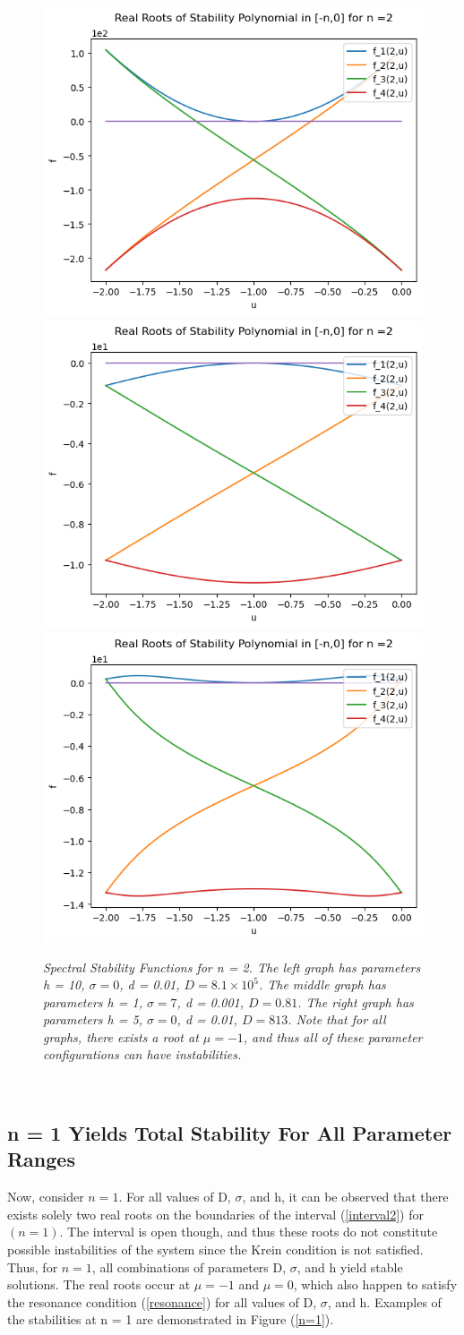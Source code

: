 \documentclass{article}
\begin{document}
\begin{figure}[hbt!]
\centering
\includegraphics[width=.3\textwidth]{special1.png}\hfill
\includegraphics[width=.3\textwidth]{special2.png}\hfill
\includegraphics[width=.3\textwidth]{special3.png}\hfill
\caption{\emph{Spectral Stability Functions for n = 2. The left graph has parameters h = 10, \(\sigma = 0\), d = 0.01, \(D = 8.1 \times 10^5\). The middle graph has parameters h = 1, \(\sigma = 7\), d = 0.001, \(D = 0.81\). The right graph has parameters h = 5, \(\sigma = 0\), d = 0.01, \(D = 813\). Note that for all graphs, there exists a root at \(\mu = -1\), and thus all of these parameter configurations can have instabilities. }}
\label{n=2}
\end{figure}
\\

\subsection{n = 1 Yields Total Stability For All Parameter Ranges}

Now, consider \(n = 1\). For all values of D, \(\sigma\), and h, it can be observed that there exists solely two real roots on the boundaries of the interval (\ref{interval2}) for \((n = 1)\). The interval is open though, and thus these roots do not constitute possible instabilities of the system since the Krein condition is not satisfied. Thus, for \(n = 1\), all combinations of parameters D, \(\sigma\), and h yield stable solutions. The real roots occur at \(\mu = -1\) and \(\mu = 0 \), which also happen to satisfy the resonance condition (\ref{resonance}) for all values of D, \(\sigma\), and h. Examples of the stabilities at n = 1 are demonstrated in Figure (\ref{n=1}). 
\\
\end{document}
